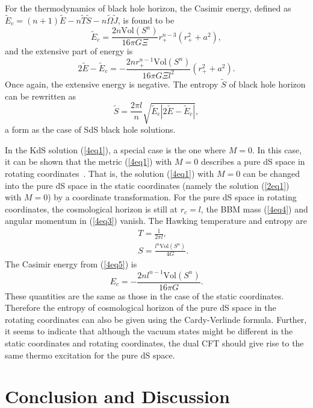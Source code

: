 \documentclass[a4paper,12pt]{article}
\newcommand{\sect}[1]{\setcounter{equation}{0}\section{#1}}
\begin{document}
For the thermodynamics of black hole horizon, the Casimir energy, defined as $\tilde E_c=
(n+1)\tilde E-n\tilde T\tilde S-n\tilde \Omega \tilde J$, is found to be
\begin{equation}
\tilde E_c= \frac{2n \mbox{Vol}(S^n)}{16\pi G \Xi}r_+^{n-3}(r_+^2+a^2),
\end{equation}
and the extensive part of energy is
\begin{equation}
2\tilde E-\tilde E_c=-\frac{2nr_+^{n-1}\mbox{Vol}(S^n)}{16\pi G\Xi l^2}(r_+^2+a^2).
\end{equation}
Once again, the extensive energy is negative. The entropy $\tilde S$ of black hole 
horizon can be rewritten as 
\begin{equation}
\label{4eq14}
\tilde S=\frac{2\pi l}{n}\sqrt{\tilde E_c|2\tilde E-\tilde E_c|},
\end{equation}
a form as the case of SdS black hole solutions. 

In the KdS solution (\ref{4eq1}), a special case is the one where $M=0$. In this case,
it can be shown that the metric (\ref{4eq1}) with $M=0$ describes a pure dS space in 
rotating coordinates~\cite{BF}. That is, the solution (\ref{4eq1}) with $M=0$ can be
changed into the pure dS space in the static coordinates (namely the solution (\ref{2eq1})
with $M=0$) by a coordinate transformation. For the pure dS space in rotating coordinates,
the cosmological horizon is still at $r_c=l$, the BBM mass (\ref{4eq4}) and angular momentum
in (\ref{4eq3}) vanish. The Hawking temperature and entropy are
\begin{eqnarray}
\label{4eq15}
&& T= \frac{1}{2\pi l}, \nonumber \\
&& S=\frac{l^n \mbox{Vol}(S^n)}{4G}.
\end{eqnarray}
The Casimir energy from (\ref{4eq5}) is 
\begin{equation}
E_c=- \frac{2n l^{n-1}\mbox{Vol}(S^n)}{16\pi G}. 
\end{equation}
These quantities are the same as those in the case of the static coordinates. Therefore the  entropy 
of cosmological horizon of the pure dS space in the rotating coordinates can also be given
using the Cardy-Verlinde formula.  Further, it seems to indicate  that  although the
vacuum states might be different in the static coordinates and rotating coordinates, the dual
CFT should give rise to the same thermo excitation for the pure dS space. 





\sect{Conclusion and Discussion}
\end{document}
